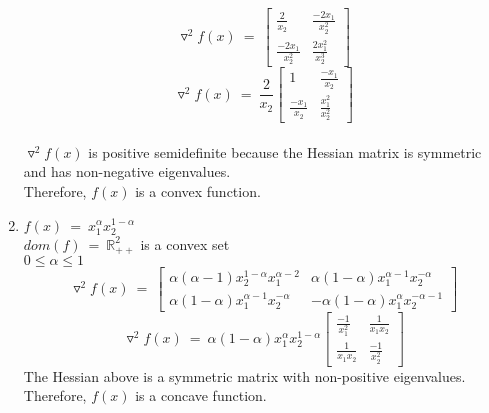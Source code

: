 \documentclass[12pt, draftcls, onecolumn]{IEEEtran}
\begin{document}
\begin{enumerate}
    \[\triangledown^2 f(x)\ =\ \begin{bmatrix}
    \frac{2}{x_2} & \frac{-2x_1}{x_2^2}\\
    \frac{-2x_1}{x_2^2} & \frac{2x_1^2}{x_2^3}
    \end{bmatrix}\]
    \[\triangledown^2 f(x)\ =\ \frac{2}{x_2} \begin{bmatrix}
    1 & \frac{-x_1}{x_2}\\
    \frac{-x_1}{x_2} & \frac{x_1^2}{x_2^2}
    \end{bmatrix}\]
    \\$\triangledown^2 f(x)$ is positive semidefinite because the Hessian matrix is symmetric and has non-negative eigenvalues.
    \\Therefore, $f(x)$ is a convex function.
    \item $f(x)\ =\ x_1^{\alpha} x_2^{1-\alpha}$
    \\$dom(f)\ =\ \mathbb{R}^2_{++}$ is a convex set
    \\$0 \leq \alpha \leq 1$
    \[\triangledown^2 f(x)\ =\ \begin{bmatrix}
    \alpha (\alpha-1) x_2^{1-\alpha} x_1^{\alpha-2} & \alpha (1-\alpha) x_1^{\alpha-1} x_2^{-\alpha}\\
    \alpha (1-\alpha) x_1^{\alpha-1} x_2^{-\alpha} & -\alpha (1-\alpha) x_1^{\alpha} x_2^{-\alpha-1}
    \end{bmatrix}\]
    \[\triangledown^2 f(x)\ =\ \alpha (1-\alpha) x_1^{\alpha} x_2^{1-\alpha} \begin{bmatrix}
    \frac{-1}{x_1^2} & \frac{1}{x_1 x_2}\\
    \frac{1}{x_1 x_2} & \frac{-1}{x_2^2}
    \end{bmatrix}\]
    The Hessian above is a symmetric matrix with non-positive eigenvalues.
    \\Therefore, $f(x)$ is a concave function.
\end{enumerate}
\end{document}
